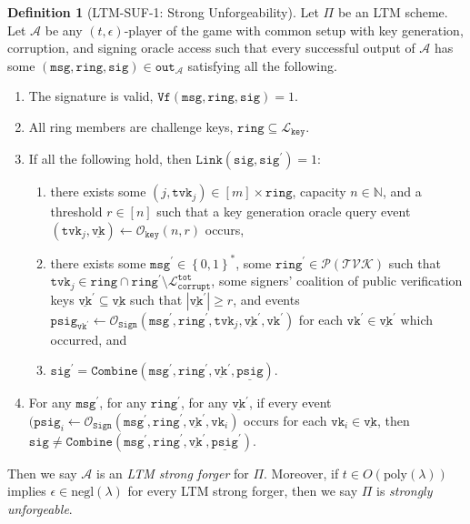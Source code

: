 \documentclass[11pt]{article}
\theoremstyle{definition}
\newtheorem{definition}[definition]{Definition}
\newcommand{\vk}{\texttt{vk}}
\newcommand{\tvk}{\texttt{tvk}}
\newcommand{\ring}{\texttt{ring}}
\newcommand{\VK}{\underline{\texttt{vk}}}
\newcommand{\sig}{\texttt{sig}}
\newcommand{\psig}{\texttt{psig}}
\newcommand{\bitstrings}{\left\{0,1\right\}^*}
\newcommand{\bbn}{\mathbb{N}}
\newcommand{\secpar}{\lambda}
\newcommand{\msg}{\texttt{msg}}
\newcommand{\sign}{\texttt{Sign}}
\newcommand{\combine}{\texttt{Combine}}
\newcommand{\PSIG}{\underline{\psig}}
\newcommand{\verify}{\texttt{Vf}}
\newcommand{\link}{\texttt{Link}}
\newcommand{\polysecpar}{O(\text{poly}(\secpar))}
\newcommand{\negl}{\text{negl}(\secpar)}
\newcommand{\signingOracle}{\mathcal{O}_{\sign}}
\newcommand{\keyOracle}{\mathcal{O}_{\texttt{key}}}
\newcommand{\challengeKeySet}{\mathcal{L}_{\texttt{key}}}
\newcommand{\corruptedTotalKeys}{\mathcal{L}_{\texttt{corrupt}}^{\texttt{tot}}}
\begin{document}
\begin{definition}[LTM-SUF-1: Strong Unforgeability]\label{def:suf}
Let $\Pi$ be an LTM scheme. Let $\mathcal{A}$ be any $(t,\epsilon)$-player of the game with common setup with key generation, corruption, and signing oracle access such that every successful output of $\mathcal{A}$ has some $(\msg, \ring, \sig) \in \texttt{out}_{\mathcal{A}}$ satisfying all the following.
\begin{enumerate}
\item The signature is valid, $\verify(\msg, \ring, \sig)=1$.

\item All ring members are challenge keys, $\ring \subseteq \challengeKeySet$.

\item If all the following hold, then $\link(\sig, \sig^\prime) = 1$:
\begin{enumerate}
\item there exists some
$(j, \tvk_j) \in [m] \times \ring$, 
capacity  $n \in \bbn$, and a 
threshold $r \in [n]$ such that
a key generation oracle query event $(\tvk_j, \VK) \leftarrow \keyOracle(n,r)$ occurs,
\item there exists some $\msg^\prime \in \bitstrings$, some $\ring^\prime \in \mathcal{P}(\mathcal{TVK})$ such that $\tvk_j \in \ring \cap \ring^\prime \setminus \corruptedTotalKeys$,  some signers' coalition of public verification keys $\VK^\prime \subseteq \VK$ such that $\left|\VK^\prime\right| \geq r$,  and events $\psig_{\vk^\prime} \leftarrow \signingOracle(\msg^\prime, \ring^\prime, \tvk_j, \VK^\prime, \vk^\prime)$ for each $\vk^\prime \in \VK^\prime$ which occurred, and
\item $\sig^\prime = \combine(\msg^\prime,\ring^\prime,\VK^\prime,\PSIG)$.
\end{enumerate}


\item For any $\msg^\prime$, for any $\ring^\prime$, for any $\VK^\prime$, if every event $(\psig_i \leftarrow \signingOracle(\msg^\prime, \ring^\prime, \VK^\prime, \vk_i)$ occurs for each  $\vk_i \in \VK$, then $\sig \neq \combine(\msg^\prime, \ring^\prime, \VK^\prime, \PSIG^\prime)$.
\end{enumerate}
Then we say $\mathcal{A}$ is an \textit{LTM strong forger} for $\Pi$. Moreover, if  $t \in \polysecpar$ implies $\epsilon \in \negl$ for every LTM strong forger, then we say $\Pi$ is \textit{strongly unforgeable}.
\end{definition}
\end{document}
